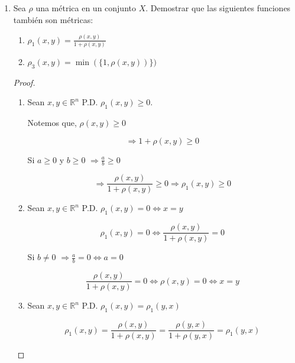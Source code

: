 \documentclass[12pt]{article}
\newcommand{\subscript}[2]{$#1 _ #2$}
\begin{document}
\begin{enumerate}[label=\textbf{\arabic*}.]

\item Sea $\rho$ una métrica en un conjunto $X$. Demostrar que las siguientes funciones también son métricas:

\begin{enumerate}[label=\alph*)]
    \item ${\rho}_{1}(x,y)=\frac{\rho(x,y)}{1+\rho(x,y)}$
    \item ${\rho}_{3}(x,y)=\min(\{1,\rho(x,y))\})$
\end{enumerate}

\begin{proof}
    

\begin{enumerate}[label=(\subscript{D}{{\arabic*}})]
\item  Sean $x,y \in \mathbb{R}^{n}$ P.D. ${\rho}_{1}(x,y) \geqslant 0$. 
        
Notemos que, ${\rho}(x,y) \geqslant 0$

\begin{equation*}
     \Rightarrow 1+{\rho}(x,y) \geqslant 0
\end{equation*}


Si $a\geqslant0$ y $b\geqslant0$ $\Rightarrow \frac{a}{b} \geqslant 0$

\begin{equation*}
    \Rightarrow \frac{{\rho}(x,y)}{1+{\rho}(x,y)} \geqslant 0    \Rightarrow {\rho}_{1}(x,y) \geqslant 0
\end{equation*}

\item  Sean $x,y \in \mathbb{R}^{n}$ P.D. ${\rho}_{1}(x,y)=0 \Leftrightarrow x=y$

\begin{equation*}
    {\rho}_{1}(x,y)=0 \Leftrightarrow \frac{{\rho}(x,y)}{1+{\rho}(x,y)} = 0
\end{equation*}

    Si $b \neq 0$ $\Rightarrow \frac{a}{b}=0 \Leftrightarrow a = 0$

\begin{equation*}
    \frac{{\rho}(x,y)}{1+{\rho}(x,y)} = 0 \Leftrightarrow {\rho}(x,y) = 0 \Leftrightarrow x = y
\end{equation*}

\item  Sean $x,y \in \mathbb{R}^{n}$ P.D. ${\rho}_{1}(x,y)={\rho}_{1}(y,x)$

\begin{equation*}
    {\rho}_{1}(x,y)= \frac{{\rho}(x,y)}{1+{\rho}(x,y)}=\frac{{\rho}(y,x)}{1+{\rho}(y,x)}= {\rho}_{1}(y,x)
\end{equation*}


\end{enumerate}
\end{proof}
\end{enumerate}
\end{document}
